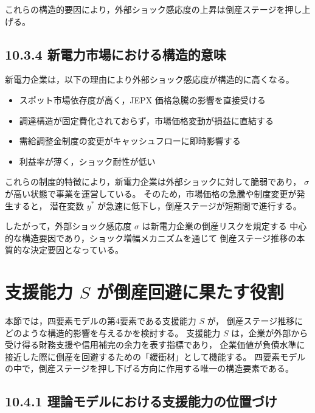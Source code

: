 これらの構造的要因により，外部ショック感応度の上昇は倒産ステージを押し上げる。

\subsection*{10.3.4 新電力市場における構造的意味}

新電力企業は，以下の理由により外部ショック感応度が構造的に高くなる。

\begin{itemize}
    \item スポット市場依存度が高く，JEPX 価格急騰の影響を直接受ける  
    \item 調達構造が固定費化されておらず，市場価格変動が損益に直結する  
    \item 需給調整金制度の変更がキャッシュフローに即時影響する  
    \item 利益率が薄く，ショック耐性が低い  
\end{itemize}

これらの制度的特徴により，新電力企業は外部ショックに対して脆弱であり，
$\sigma$ が高い状態で事業を運営している。
そのため，市場価格の急騰や制度変更が発生すると，
潜在変数 $y^*$ が急速に低下し，倒産ステージが短期間で進行する。

したがって，外部ショック感応度 $\sigma$ は新電力企業の倒産リスクを規定する
中心的な構造要因であり，ショック増幅メカニズムを通じて
倒産ステージ推移の本質的な決定要因となっている。


\section{支援能力 $S$ が倒産回避に果たす役割}

本節では，四要素モデルの第4要素である支援能力 $S$ が，
倒産ステージ推移にどのような構造的影響を与えるかを検討する。
支援能力 $S$ は，企業が外部から受け得る財務支援や信用補完の余力を表す指標であり，
企業価値が負債水準に接近した際に倒産を回避するための「緩衝材」として機能する。
四要素モデルの中で，倒産ステージを押し下げる方向に作用する唯一の構造要素である。

\subsection*{10.4.1 理論モデルにおける支援能力の位置づけ}

